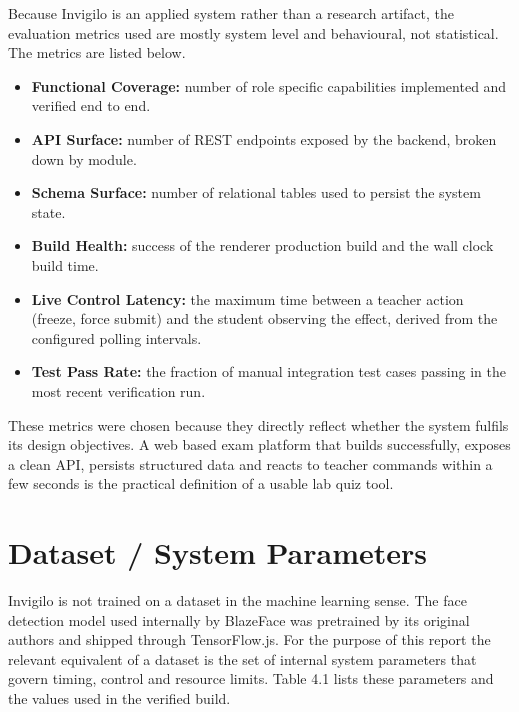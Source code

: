 \documentclass[12pt, a4paper]{report}
\begin{document}
\begin{justify}
  {\fontsize{12}{18}\selectfont
    Because Invigilo is an applied system rather than a research artifact, the evaluation metrics used are mostly system level and behavioural, not statistical. The metrics are listed below.

    \begin{itemize}
        \item \textbf{Functional Coverage:} number of role specific capabilities implemented and verified end to end.
        \item \textbf{API Surface:} number of REST endpoints exposed by the backend, broken down by module.
        \item \textbf{Schema Surface:} number of relational tables used to persist the system state.
        \item \textbf{Build Health:} success of the renderer production build and the wall clock build time.
        \item \textbf{Live Control Latency:} the maximum time between a teacher action (freeze, force submit) and the student observing the effect, derived from the configured polling intervals.
        \item \textbf{Test Pass Rate:} the fraction of manual integration test cases passing in the most recent verification run.
    \end{itemize}

    These metrics were chosen because they directly reflect whether the system fulfils its design objectives. A web based exam platform that builds successfully, exposes a clean API, persists structured data and reacts to teacher commands within a few seconds is the practical definition of a usable lab quiz tool.
  }
\end{justify}

\section{Dataset / System Parameters}

\begin{justify}
  {\fontsize{12}{18}\selectfont
    Invigilo is not trained on a dataset in the machine learning sense. The face detection model used internally by BlazeFace was pretrained by its original authors and shipped through TensorFlow.js. For the purpose of this report the relevant equivalent of a dataset is the set of internal system parameters that govern timing, control and resource limits. Table 4.1 lists these parameters and the values used in the verified build.
  }
\end{justify}
\end{document}
